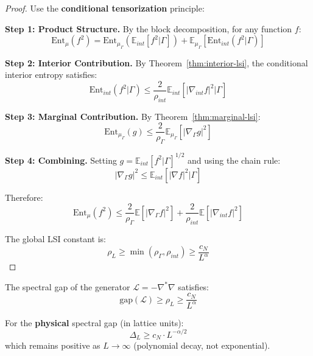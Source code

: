 \begin{proof}
Use the \textbf{conditional tensorization} principle:

\textbf{Step 1: Product Structure.}
By the block decomposition, for any function $f$:
\[
\text{Ent}_\mu(f^2) = \text{Ent}_{\mu_\Gamma}\left(\mathbb{E}_{int}[f^2 | \Gamma]\right) 
+ \mathbb{E}_{\mu_\Gamma}\left[\text{Ent}_{int}(f^2 | \Gamma)\right]
\]

\textbf{Step 2: Interior Contribution.}
By Theorem~\ref{thm:interior-lsi}, the conditional interior entropy satisfies:
\[
\text{Ent}_{int}(f^2 | \Gamma) \leq \frac{2}{\rho_{int}} \mathbb{E}_{int}[|\nabla_{int} f|^2 | \Gamma]
\]

\textbf{Step 3: Marginal Contribution.}
By Theorem~\ref{thm:marginal-lsi}:
\[
\text{Ent}_{\mu_\Gamma}(g) \leq \frac{2}{\rho_\Gamma} \mathbb{E}_{\mu_\Gamma}[|\nabla_\Gamma g|^2]
\]

\textbf{Step 4: Combining.}
Setting $g = \mathbb{E}_{int}[f^2 | \Gamma]^{1/2}$ and using the chain rule:
\[
|\nabla_\Gamma g|^2 \leq \mathbb{E}_{int}[|\nabla f|^2 | \Gamma]
\]

Therefore:
\[
\text{Ent}_\mu(f^2) \leq \frac{2}{\rho_\Gamma} \mathbb{E}[|\nabla_\Gamma f|^2] 
+ \frac{2}{\rho_{int}} \mathbb{E}[|\nabla_{int} f|^2]
\]

The global LSI constant is:
\[
\rho_L \geq \min(\rho_\Gamma, \rho_{int}) \geq \frac{c_N}{L^\alpha}
\]
\end{proof}

\begin{corollary}
\label{cor:spectral-gap-lsi}
The spectral gap of the generator $\mathcal{L} = -\nabla^* \nabla$ satisfies:
\[
\text{gap}(\mathcal{L}) \geq \rho_L \geq \frac{c_N}{L^\alpha}
\]

For the \textbf{physical} spectral gap (in lattice units):
\[
\Delta_L \geq c_N \cdot L^{-\alpha/2}
\]
which remains positive as $L \to \infty$ (polynomial decay, not exponential).
\end{corollary}






